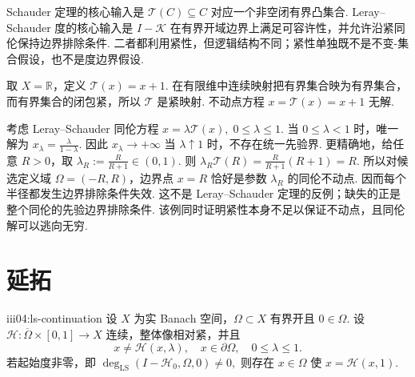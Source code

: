 \begin{FARemark}
Schauder 定理的核心输入是 \(\displaystyle\mathcal T(C)\subseteq C\) 对应一个非空闭有界凸集合. Leray--Schauder 度的核心输入是 \(\displaystyle I-\mathcal K\) 在有界开域边界上满足可容许性，并允许沿紧同伦保持边界排除条件. 二者都利用紧性，但逻辑结构不同；紧性单独既不是不变-集合假设，也不是度边界假设.
\end{FARemark}

\begin{FACounterexample}[紧性单独不给不动点]\label{iii04:ce-no-apr-bound}
取 \(\displaystyle X=\mathbb R\)，定义 \(\displaystyle\mathcal T(x)=x+1\). 在有限维中连续映射把有界集合映为有界集合，而有界集合的闭包紧，所以 \(\displaystyle\mathcal T\) 是紧映射. 不动点方程 \(\displaystyle x=\mathcal T(x)=x+1\) 无解.

考虑 Leray--Schauder 同伦方程
\(\displaystyle x=\lambda\mathcal T(x), \; 0\leqslant\lambda\leqslant1.\)
当 \(\displaystyle0\leqslant\lambda<1\) 时，唯一解为
\(\displaystyle x_{\lambda} = \frac{\lambda}{1-\lambda}.\)
因此 \(\displaystyle x_{\lambda}\to+\infty\) 当 \(\displaystyle\lambda\uparrow1\) 时，不存在统一先验界. 更精确地，给任意 \(\displaystyle R>0\)，取
\(\displaystyle \lambda_R := \frac{R}{R+1}\in(0,1).\)
则
\(\displaystyle \lambda_R\mathcal T(R) = \frac{R}{R+1}(R+1) = R.\)
所以对候选定义域 \(\displaystyle\Omega=(-R,R)\)，边界点 \(\displaystyle x=R\) 恰好是参数 \(\displaystyle\lambda_R\) 的同伦不动点. 因而每个半径都发生边界排除条件失效. 这不是 Leray--Schauder 定理的反例；缺失的正是整个同伦的先验边界排除条件. 该例同时证明紧性本身不足以保证不动点，且同伦解可以逃向无穷.
\end{FACounterexample}

\section{延拓}\label{sec:iii04-continuation}

\begin{FATheorem}{iii04:ls-continuation}
设 \(\displaystyle X\) 为实 Banach 空间，\(\displaystyle\Omega\subset X\) 有界开且 \(\displaystyle0\in\Omega\). 设 \(\displaystyle\mathcal H:\overline\Omega\times[0,1]\to X\) 连续，整体像相对紧，并且
\[
x\neq\mathcal H(x,\lambda),
\quad
x\in\partial\Omega,
\quad
0\leqslant\lambda\leqslant1.
\]
若起始度非零，即
\(\displaystyle \deg_{\mathrm{LS}}(I-\mathcal H_0,\Omega,0)\neq0,\)
则存在 \(\displaystyle x\in\Omega\) 使 \(\displaystyle x=\mathcal H(x,1)\).
\end{FATheorem}

